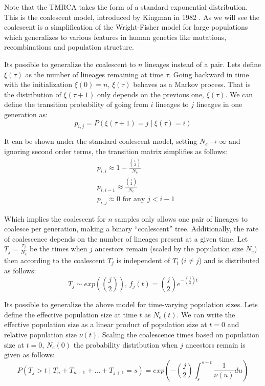 Note that the TMRCA takes the form of a standard exponential distribution. This is the coalescent model, introduced by Kingman in 1982 \cite{Kingman1982, Kingman1982b, Kingman1982c}. As we will see the coalescent is a simplification of the Wright-Fisher model \cite{Wright1931, Fisher1930} for large populations which generalizes to various features in human genetics like mutations, recombinations and population structure. 

Its possible to generalize the coalescent to \(n\) lineages instead of a pair. Lets define $\xi(\tau)$ as the number of lineages remaining at time $\tau$. Going backward in time with the initialization $\xi(0) = n$, $\xi(\tau)$ behaves as a Markov process. That is the distribution of $\xi(\tau + 1)$ only depends on the previous one, $\xi(\tau)$. We can define the transition probability of going from $i$ lineages to $j$ lineages in one generation as:
\begin{equation}
    p_{i,j} = P(\xi(\tau + 1) = j \mid \xi(\tau) = i)
\end{equation}

It can be shown under the standard coalescent model, setting $N_e \rightarrow \infty$ and ignoring second order terms, the transition matrix simplifies as follows:
\begin{equation}
\begin{aligned}
    &p_{i,i} \approx 1 -  \frac{\binom{i}{2}}{N_e} \\
    &p_{i,i-1} \approx \frac{\binom{i}{2}}{N_e} \\
    &p_{i,j} \approx 0 \text{  for any  } j < i - 1
\end{aligned}
\end{equation}

Which implies the coalescent for \(n\) samples only allows one pair of lineages to coalesce per generation, making a binary ``coalescent'' tree. Additionally, the rate of coalescence depends on the number of lineages present at a given time. Let $T_j = \frac{\tau_j}{N_e}$ be the times when $j$ ancestors remain (scaled by the population size $N_e$) then according to the coalescent $T_j$ is independent of $T_i$ ($i \neq j$) and is distributed as follows:
\begin{equation}
    T_j \sim exp \left( \binom{j}{2} \right)  \text{,   } f_j(t) =  \binom{j}{2}e^{- \binom{j}{2}t}
\end{equation}

Its possible to generalize the above model for time-varying population sizes. Lets define the effective population size at time $t$ as $N_e(t)$. We can write the effective population size as a linear product of population size at $t=0$ and relative population size $\nu(t)$. Scaling the coalescence times based on population size at $t=0$, $N_e(0)$ the probability distribution when $j$ ancestors remain is given as follows:
\begin{equation}
    P(T_j > t \mid T_n + T_{n-1} + ... + T_{j+1} = s) = exp\left( - \binom{j}{2} \int_{s}^{s+t} \frac{1}{\nu(u)} du  \right)
\label{eq:coal_general}
\end{equation}

